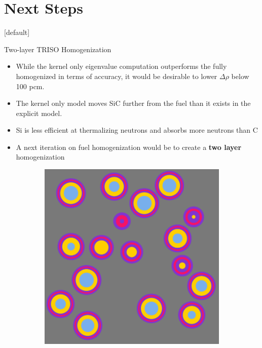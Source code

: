 \documentclass[9pt,t,aspectratio=169]{beamer}
\makeatletter
\newenvironment{withoutheadline}{
       \setbeamertemplate{headline}[default]
       \def\beamer@entrycode{\vspace*{-\headheight}}
    }{}
\makeatother
\begin{document}
\section{Next Steps}
\begin{withoutheadline}
\begin{frame}{Two-layer TRISO Homogenization}
    \pause
    \begin{itemize}
        \item<2-> While the kernel only eigenvalue computation outperforms the fully homogenized in terms of accuracy, it would be desirable to lower $\Delta \rho$ below 100 pcm.
        \item<3-> The kernel only model moves SiC further from the fuel than it exists in the explicit model.
        \item<3-> Si is less efficient at thermalizing neutrons and absorbs more neutrons than C
        \item<4-> A next iteration on fuel homogenization would be to create a \textbf{two layer} homogenization
    \end{itemize}
    \begin{figure}
        \pause
        \pause
        \begin{subfigure}{0.3\linewidth}
            \centering
            \includegraphics[width=\linewidth]{figures/explicit_viz.png}

\end{subfigure}
\end{figure}
\end{frame}
\end{withoutheadline}
\end{document}
